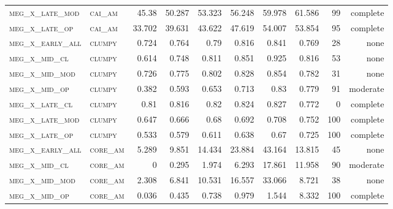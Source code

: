 \begin{landscape}
\begin{center}
\begin{footnotesize}
\begin{longtable}{llrrrrr|rrr}
\textsc{meg\_x\_late\_mod } & \textsc{cai\_am   }    & 45.38    & 50.287   & 53.323   & 56.248   & 59.978    & 61.586        & 99            & complete              \\
\textsc{meg\_x\_late\_op  } & \textsc{cai\_am   }    & 33.702   & 39.631   & 43.622   & 47.619   & 54.007    & 53.854        & 95            & complete              \\
\textsc{meg\_x\_early\_all} & \textsc{clumpy    }    & 0.724    & 0.764    & 0.79     & 0.816    & 0.841     & 0.769         & 28            & none             \\
\textsc{meg\_x\_mid\_cl   } & \textsc{clumpy    }    & 0.614    & 0.748    & 0.811    & 0.851    & 0.925     & 0.816         & 53            & none               \\
\textsc{meg\_x\_mid\_mod  } & \textsc{clumpy    }    & 0.726    & 0.775    & 0.802    & 0.828    & 0.854     & 0.782         & 31            & none             \\
\textsc{meg\_x\_mid\_op   } & \textsc{clumpy    }    & 0.382    & 0.593    & 0.653    & 0.713    & 0.83      & 0.779         & 91            & moderate              \\
\textsc{meg\_x\_late\_cl  } & \textsc{clumpy    }    & 0.81     & 0.816    & 0.82     & 0.824    & 0.827     & 0.772         & 0             & complete            \\
\textsc{meg\_x\_late\_mod } & \textsc{clumpy    }    & 0.647    & 0.666    & 0.68     & 0.692    & 0.708     & 0.752         & 100           & complete             \\
\textsc{meg\_x\_late\_op  } & \textsc{clumpy    }    & 0.533    & 0.579    & 0.611    & 0.638    & 0.67      & 0.725         & 100           & complete             \\
\textsc{meg\_x\_early\_all} & \textsc{core\_am  }    & 5.289    & 9.851    & 14.434   & 23.884   & 43.164    & 13.815        & 45            & none             \\
\textsc{meg\_x\_mid\_cl   } & \textsc{core\_am  }    & 0        & 0.295    & 1.974    & 6.293    & 17.861    & 11.958        & 90            & moderate              \\
\textsc{meg\_x\_mid\_mod  } & \textsc{core\_am  }    & 2.308    & 6.841    & 10.531   & 16.557   & 33.066    & 8.721         & 38            & none             \\
\textsc{meg\_x\_mid\_op   } & \textsc{core\_am  }    & 0.036    & 0.435    & 0.738    & 0.979    & 1.544     & 8.332         & 100           & complete             \\

\end{longtable}
\end{footnotesize}
\end{center}
\end{landscape}
